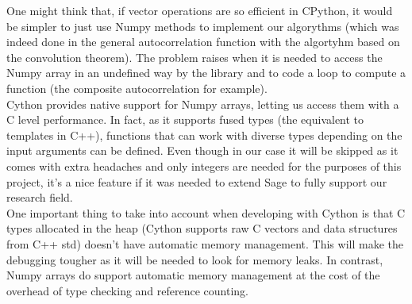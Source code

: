 One might think that, if vector operations are so efficient in CPython, it would
be simpler to just use Numpy methods to implement our algorythms (which was
indeed done in the general autocorrelation function with the algortyhm
based on the convolution theorem). The problem raises when it is needed to
access the Numpy array in an undefined way by the library and to code a loop to
compute a function (the composite autocorrelation for example).\\

Cython provides native support for Numpy arrays, letting us access them with a
C level performance. In fact, as it supports fused types (the equivalent to
templates in C++), functions that can work with diverse types
depending on the input arguments can be defined. Even though in our case it will
be skipped as it comes with extra headaches and only integers are needed for the
purposes of this project, it's a nice feature if it was needed to extend Sage to
fully support our research field.\\

One important thing to take into account when developing with Cython is that
C types allocated in the heap (Cython supports raw C vectors and data structures
from C++ std) doesn't have automatic memory management. This will make the
debugging tougher as it will be needed to look for memory leaks. In contrast,
Numpy arrays do support automatic memory management at the cost of the overhead
of type checking and reference counting.\\
